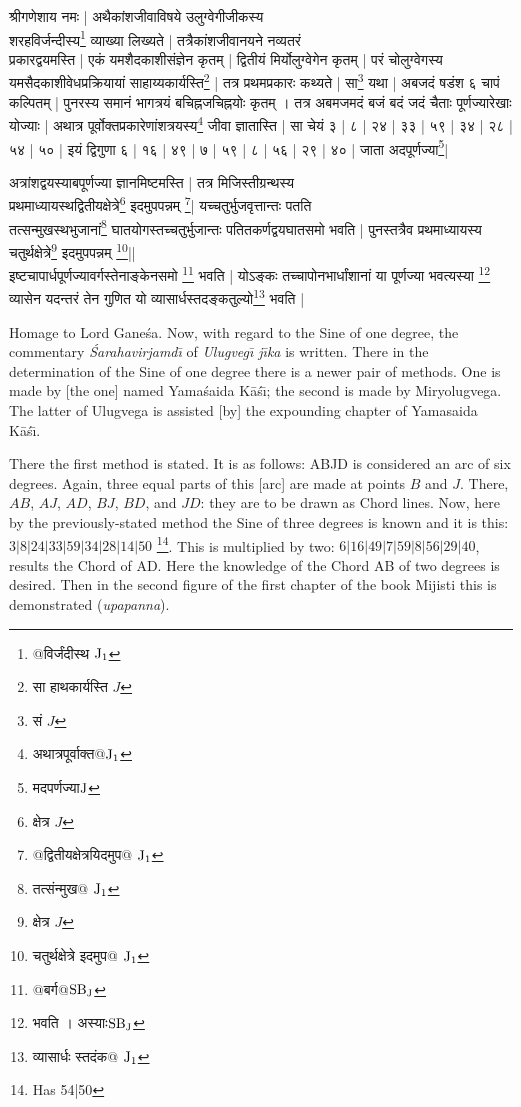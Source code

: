 \documentclass[11pt,a5paper]{book}
\def\Ganesa{Ga\-\*ne\-\'sa}
\begin{document}
{\s  
श्रीगणेशाय नमः | 
अथैकांशजीवाविषये
उलुग्वेगीजीकस्य \\
शरहविर्जन्दीस्य\footnote{{\s @विर्जंदीस्थ }${\rm J_1}$}
व्याख्या लिख्यते |
तत्रैकांशजी\-वान\-यने नव्यतरं \\प्रकारद्वयमस्ति |
एकं यमशैदकाशीसंज्ञेन कृतम् |
द्वितीयं मिर्योलुग्वेगेन कृतम् |
परं चोलुग्वेगस्य यमसैदकाशीवेधप्रक्रियायां
साहाय्यकार्यस्ति\footnote{{\s सा हाथकार्यस्ति} $J$} |
तत्र प्रथमप्रकारः कथ्यते | सा\footnote{{\s सं} $J$} यथा |
अबजदं षडंश ६ चापं कल्पितम् |
पुनरस्य समानं भागत्रयं बचिह्नजचिह्नयोः कृतम् ।
तत्र अबमजमदं बजं बदं जदं चैताः पूर्णज्यारेखाः
योज्याः |
अथात्र पूर्वोक्तप्रकारेणांशत्रयस्य\footnote{{\s अथात्रपूर्वाक्त@}${\rm J_1}$}
जीवा ज्ञातास्ति | सा चेयं ३ | ८ | २४ | ३३ | ५९ | ३४ | २८ | ५४ | ५० |
इयं द्विगुणा ६ | १६ | ४९ | ७ | ५९ | ८ | ५६ | २९ | ४० | जाता अदपूर्णज्या\footnote{{\s मदपर्णज्या}${\rm J}$}|

अत्रांशद्वयस्याबपूर्णज्या ज्ञानमिष्टमस्ति |
तत्र मिजिस्तीग्रन्थस्य \\
प्रथमाध्यायस्थद्वितीयक्षेत्रे\footnote{{\s क्षेत्र} $J$} 
इदमुपपन्नम् \footnote{{\s @द्वितीयक्षेत्रयिदमुप@ }${\rm J_1}$}|
यच्चतुर्भुजवृत्तान्तः पतति \\
तत्सन्मुखस्थभुजानां\footnote{{\s तत्संन्मुख@ } ${\rm J_1}$}
घातयोगस्तच्चतुर्भुजान्तः पतितकर्णद्वयघातसमो भवति |
पुनस्तत्रैव प्रथमाध्यायस्य
चतुर्थक्षेत्रे\footnote{{\s क्षेत्र} $J$} इदमुपपन्नम् \footnote{{\s चतुर्थक्षेत्रे इदमुप@ }${\rm J_1}$}|| \\
इष्टचापार्धपूर्णज्यावर्गस्तेनाङ्केनसमो \footnote{{\s @बर्ग@}${\rm SB_J}$} भवति |
योऽङ्कः %
 तच्चापोनभार्धांशानां या पूर्णज्या भवत्यस्या \footnote{{\s भवति । अस्याः}${\rm SB_J}$}
व्यासेन यदन्तरं तेन गुणित यो
व्यासार्धस्तदङ्कतुल्यो\footnote{{\s व्यासार्धः स्तदंक@ }${\rm J_1}$}
भवति |}


\newpage

Homage to Lord \Ganesa.  Now, with regard to the Sine of one degree, the commentary
\textit{\'Sarahavirja\*md\={\i}} of \textit{Ulugveg\={\i} j\={\i}ka} is written.
There in the determination of the Sine of one degree there is a newer pair of methods. 
One is made by [the one] named Yama\'saida K\=a\'s\={\i}; the second is made by
Miryolugvega. The latter of Ulugvega is assisted [by] the expounding chapter of Yamasaida K\=a\'s\={\i}. 

There the first method  is stated. It is as follows: 
ABJD is considered an arc of six degrees. Again, three equal parts of this [arc] are made at points $B$ and $J$. 
There, $AB$, $AJ$, $AD$, $BJ$, $BD$, and $JD$: they are to be drawn as Chord lines. 
Now, here by the previously-stated method the Sine of three degrees is known and 
it is this: $3|8|24|33|59|34|28|14|50$ \footnote{Has 54|50}.
This is multiplied by two: $6|16|49|7|59|8|56|29|40$, results the Chord of AD. 
Here the knowledge of the Chord AB of two degrees is desired. 
Then in the second figure of the first chapter of the book Mijisti this is demonstrated (\textit{upapanna}). 
\end{document}
